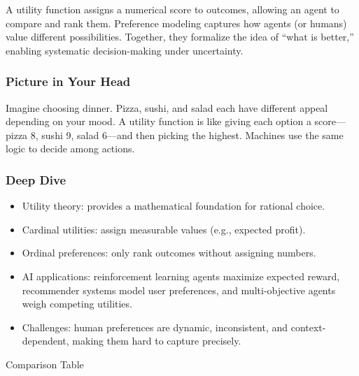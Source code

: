 \documentclass[
  letterpaper,
  DIV=11,
  numbers=noendperiod]{scrreprt}
\providecommand{\tightlist}{%
  \setlength{\itemsep}{0pt}\setlength{\parskip}{0pt}}
\begin{document}
A utility function assigns a numerical score to outcomes, allowing an
agent to compare and rank them. Preference modeling captures how agents
(or humans) value different possibilities. Together, they formalize the
idea of ``what is better,'' enabling systematic decision-making under
uncertainty.

\subsubsection{Picture in Your Head}\label{picture-in-your-head-11}

Imagine choosing dinner. Pizza, sushi, and salad each have different
appeal depending on your mood. A utility function is like giving each
option a score---pizza 8, sushi 9, salad 6---and then picking the
highest. Machines use the same logic to decide among actions.

\subsubsection{Deep Dive}\label{deep-dive-11}

\begin{itemize}
\tightlist
\item
  Utility theory: provides a mathematical foundation for rational
  choice.
\item
  Cardinal utilities: assign measurable values (e.g., expected profit).
\item
  Ordinal preferences: only rank outcomes without assigning numbers.
\item
  AI applications: reinforcement learning agents maximize expected
  reward, recommender systems model user preferences, and
  multi-objective agents weigh competing utilities.
\item
  Challenges: human preferences are dynamic, inconsistent, and
  context-dependent, making them hard to capture precisely.
\end{itemize}

Comparison Table
\end{document}
